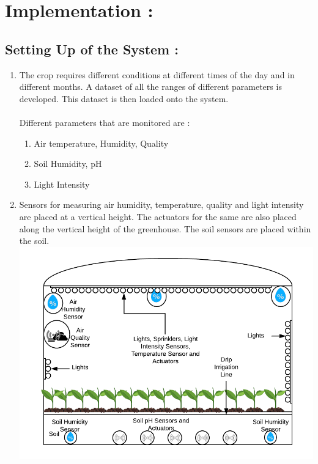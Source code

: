 \documentclass[12pt]{extarticle}
\begin{document}
\section{Implementation : }
\subsection{Setting Up of the System :}
    \begin{enumerate}[label=\alph*]
        \item 
        The crop requires different conditions at different times of the day and in different months. A dataset of all the ranges of different parameters is developed. This dataset is then loaded onto the system.\\\\
        Different parameters that are monitored are :
            \begin{enumerate}
                \item Air temperature, Humidity, Quality
                \item Soil Humidity, pH
                \item Light Intensity
            \end{enumerate}
        \item
        Sensors for measuring air humidity, temperature, quality and light intensity are placed at a vertical height. The actuators for the same are also placed along the vertical height of the greenhouse. The soil sensors are placed within the soil.\\
        \includegraphics[width=13cm]{sensors.png}
    \end{enumerate}
\end{document}
